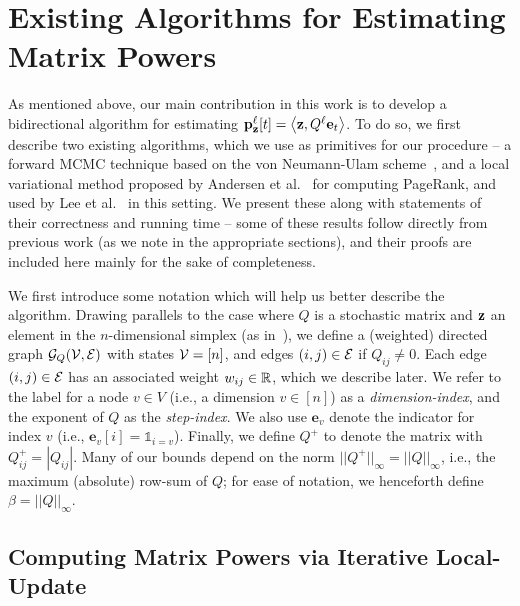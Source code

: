 \section{Existing Algorithms for Estimating Matrix Powers}

As mentioned above, our main contribution in this work is to develop a bidirectional algorithm for estimating ${\mathbf{p}}_\mathbf{z}^{\ell}[t] =\left< \mathbf{z}, Q^{\ell}\mathbf{e}_t \right>$.
To do so, we first describe two existing algorithms, which we use as primitives for our procedure -- a forward MCMC technique based on the von Neumann-Ulam scheme~\cite{Wasow1952,ji2013convergence}, and a local variational method proposed by Andersen et al.~\cite{andersen2007local} for computing PageRank, and used by Lee et al.~\cite{lee2014asynchronous} in this setting. 
We present these along with statements of their correctness and running time -- some of these results follow directly from previous work (as we note in the appropriate sections), and their proofs are included here mainly for the sake of completeness.

We first introduce some notation which will help us better describe the algorithm.
Drawing parallels to the case where $Q$ is a stochastic matrix and $\mathbf{z}$ an element in the $n$-dimensional simplex (as in~\cite{banerjee2015fast}), we define a (weighted) directed graph ${\mathcal{G}}_Q({\mathcal{V}},{\mathcal{E}})$ with states ${\mathcal{V}} = [n]$, and edges $(i,j)\in {\mathcal{E}}$ if $Q_{ij}\neq 0$. 
Each edge $(i,j)\in{\mathcal{E}}$ has an associated weight $w_{ij}\in\mathbb{R}$, which we describe later.
We refer to the label for a node $v\in V$ (i.e., a dimension $v\in[n]$) as a \emph{dimension-index}, and the exponent of $Q$ as the \emph{step-index}.
We also use $\mathbf{e}_v$ denote the indicator for index $v$ (i.e., $\mathbf{e}_v[i] = \mathds{1}_{i=v}$). 
Finally, we define $Q^+$ to denote the matrix with $Q^+_{ij} = |Q_{ij}|$. 
Many of our bounds depend on the norm $||Q^+||_{\infty} = ||Q||_{\infty}$, i.e., the maximum (absolute) row-sum of $Q$; for ease of notation, we henceforth define $\beta = ||Q||_{\infty}$. 



\subsection{Computing Matrix Powers via Iterative Local-Update}
\label{ssec:reverse}

